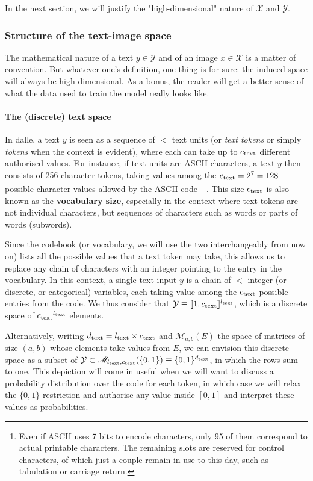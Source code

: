\documentclass{article}
\begin{document}
\begin{multicols}{2}
In the next section, we will justify the "high-dimensional" nature of $\mathcal{X}$ and $\mathcal{Y}$.

\subsubsection{Structure of the text-image space}

The mathematical nature of a text $y \in \mathcal{Y}$ and of an image $x\in\mathcal{X}$ is a matter of convention. But whatever one's definition, one thing is for sure: the induced space will always be high-dimensional. As a bonus, the reader will get a better sense of what the data used to train the model really looks like.

\paragraph{The (discrete) text space}

In \gls{dalle}, a text $y$ is seen as a sequence of $\lt$ text units (or \emph{text \glspl{token}} or simply \emph{tokens} when the context is evident), where each can take up to ${c_{\mathrm{text}}}$ different authorised values.
For instance, if text units are ASCII-characters, a text $y$ then consists of 256 character tokens, taking values among the ${c_{\mathrm{text}}}=2^7=128$ possible character values allowed by the ASCII code
    \footnote{
    Even if ASCII uses 7 bits to encode characters, only 95 of them correspond to actual printable characters.
    The remaining slots are reserved for control characters, of which just a couple remain in use to this day, such as tabulation or carriage return.
    }
.
This  size ${c_{\mathrm{text}}}$ is also known as the \textbf{vocabulary size}, especially in the context where text tokens are not individual characters, but sequences of characters such as words or parts of words (subwords).

Since the codebook (or vocabulary, we will use the two interchangeably from now on) lists all the possible values that a text token may take, this allows us to replace any chain of characters with an integer pointing to the entry in the vocabulary. 
In this context, a single text input $y$ is a chain of $\lt$ integer (or discrete, or categorical) variables, each taking value among the ${c_{\mathrm{text}}}$ possible entries from the code.
We thus consider that $\mathcal{Y}\equiv [\![1,{c_{\mathrm{text}}} ]\!]^{{l_{\mathrm{text}}}}$, which is a discrete space of ${c_{\mathrm{text}}}^{l_{\mathrm{text}}}$ elements. 

Alternatively, writing ${d_{\mathrm{text}}} = {l_{\mathrm{text}}} \times {c_{\mathrm{text}}}$ and $\mathscr{M}_{a,b}(E)$ the space of matrices of size $(a,b)$ whose elements take values from $E$, we can envision this discrete space as a subset of $\mathcal{Y} \subset \mathscr{M}_{{l_{\mathrm{text}}},{c_{\mathrm{text}}}}(\{0,1\})\equiv \{0,1\}^{d_{\mathrm{text}}}$, in which the rows sum to one.
This depiction will come in useful when we will want to discuss a probability distribution over the code for each token, in which case we will relax the $\{0,1\}$ restriction and authorise any value inside $[0,1]$ and interpret these values as probabilities.


\end{multicols}
\end{document}
